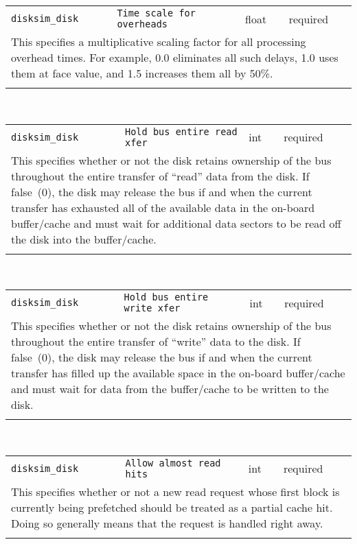 \noindent 
\begin{tabular}{|p{\lpmodwidth}|p{\lpnamewidth}|p{0.5in}|p{0.5in}|}
\cline{1-4}
\texttt{disksim\_disk} & \texttt{Time scale for overheads} & float & required \\ 
\cline{1-4}
\multicolumn{4}{|p{6in}|}{
This specifies a multiplicative scaling factor for all processing overhead
times. For example, 0.0 eliminates all such delays, 1.0 uses them at
face value, and 1.5 increases them all by 50\%.
}\\ 
\cline{1-4}
\multicolumn{4}{p{5in}}{}\\
\end{tabular}\\ 
\noindent 
\begin{tabular}{|p{\lpmodwidth}|p{\lpnamewidth}|p{0.5in}|p{0.5in}|}
\cline{1-4}
\texttt{disksim\_disk} & \texttt{Hold bus entire read xfer} & int & required \\ 
\cline{1-4}
\multicolumn{4}{|p{6in}|}{
This specifies whether or not the disk retains ownership of the bus
throughout the entire transfer of ``read'' data from the disk. If
false~(0), the disk may release the bus if and when the current
transfer has exhausted all of the available data in the on-board
buffer/cache and must wait for additional data sectors to be read off
the disk into the buffer/cache.
}\\ 
\cline{1-4}
\multicolumn{4}{p{5in}}{}\\
\end{tabular}\\ 
\noindent 
\begin{tabular}{|p{\lpmodwidth}|p{\lpnamewidth}|p{0.5in}|p{0.5in}|}
\cline{1-4}
\texttt{disksim\_disk} & \texttt{Hold bus entire write xfer} & int & required \\ 
\cline{1-4}
\multicolumn{4}{|p{6in}|}{
This specifies whether or not the disk retains ownership of the bus
throughout the entire transfer of ``write'' data to the disk. If
false~(0), the disk may release the bus if and when the current
transfer has filled up the available space in the on-board
buffer/cache and must wait for data from the buffer/cache to be
written to the disk.
}\\ 
\cline{1-4}
\multicolumn{4}{p{5in}}{}\\
\end{tabular}\\ 
\noindent 
\begin{tabular}{|p{\lpmodwidth}|p{\lpnamewidth}|p{0.5in}|p{0.5in}|}
\cline{1-4}
\texttt{disksim\_disk} & \texttt{Allow almost read hits} & int & required \\ 
\cline{1-4}
\multicolumn{4}{|p{6in}|}{
This specifies whether or not a new read request whose first block is
currently being prefetched should be treated as a partial cache hit.
Doing so generally means that the request is handled right away.
}\\ 
\cline{1-4}
\multicolumn{4}{p{5in}}{}\\
\end{tabular}\\ 
